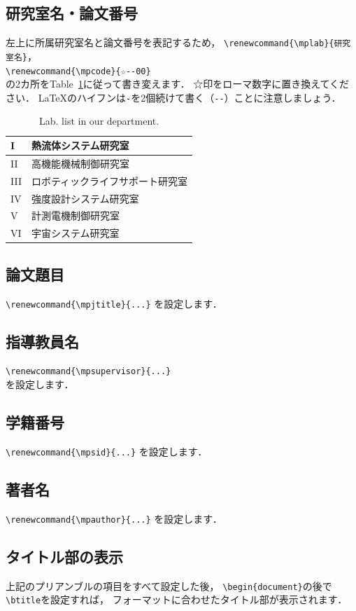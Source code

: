 \documentclass[twocolumn]{jsarticle}
\renewcommand{\mplab}{□□□□□□研究室}
\renewcommand{\mpcode}{☆--10}
\renewcommand{\mpjtitle}{
  卒業論文概要原稿用\LaTeXe テンプレート
}
\renewcommand{\mpsupervisor}{○○~○○~教授}
\renewcommand{\mpsid}{0123456}
\renewcommand{\mpauthor}{△△~△△}
\begin{document}
\subsection{研究室名・論文番号}
左上に所属研究室名と論文番号を表記するため，
\verb+\renewcommand{\mplab}{研究室名}+，\\
\verb+\renewcommand{\mpcode}{☆--00}+ \\
の2カ所をTable~\ref{table:lablist}に従って書き変えます．
☆印をローマ数字に置き換えてください．
\LaTeX のハイフンは\verb+-+を2個続けて書く（\verb+--+）ことに注意しましょう．
%
\begin{table}[ht]
  \centering
  \caption{Lab. list in our department.}
  \label{table:lablist}
  \begin{tabular}{|l|l|}\hline
    I & 熱流体システム研究室 \\ \hline 
    II & 高機能機械制御研究室 \\ \hline
    III & ロボティックライフサポート研究室 \\ \hline 
    IV & 強度設計システム研究室 \\ \hline
    V & 計測電機制御研究室 \\ \hline
    VI & 宇宙システム研究室 \\ \hline
  \end{tabular}
\end{table}

\subsection{論文題目}
\verb+\renewcommand{\mpjtitle}{...}+
を設定します．

\subsection{指導教員名}
\verb+\renewcommand{\mpsupervisor}{...}+ \\
を設定します．

\subsection{学籍番号}
\verb+\renewcommand{\mpsid}{...}+
を設定します．

\subsection{著者名}
\verb+\renewcommand{\mpauthor}{...}+
を設定します．

\subsection{タイトル部の表示}
上記のプリアンブルの項目をすべて設定した後，
\verb+\begin{document}+の後で\verb+\btitle+を設定すれば，
フォーマットに合わせたタイトル部が表示されます．
\end{document}

